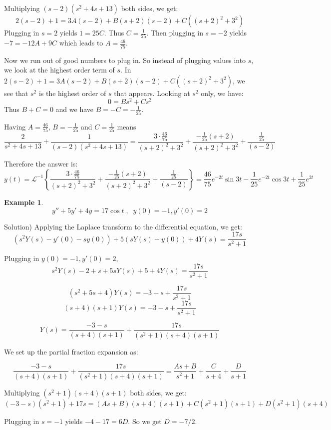 \documentclass[12pt]{report}
\newtheorem{ex}{Example}[section]
\begin{document}
Multiplying $(s-2)(s^2+4s+13)$ both sides, we get:
$$2(s-2)+1 = 3A(s-2)+ B(s+2)(s-2)+C((s+2)^2 + 3^2) $$
Plugging in $s=2$ yields $1=25C$. Thus $C=\frac{1}{25}$. Then plugging in $s=-2$ yields $-7=-12A + 9C $ which leads to $A=\frac{46}{75}$. 

Now we run out of good numbers to plug in. So instead of plugging values into $s$, we look at the highest order term of $s$. In $2(s-2)+1 = 3A(s-2)+ B(s+2)(s-2)+C((s+2)^2 + 3^2) $, we see that $s^2$ is the highest order of $s$ that appears. Looking at $s^2$ only, we have:
$$0= B s^2 + C s^2 $$
Thus $B+C=0$ and we have $B=-C = -\frac{1}{25}$.

Having $A=\frac{46}{75}$, $B= -\frac{1}{25}$ and $C=\frac{1}{25}$ means
$$ \frac{2}{s^2+4s+13} +\frac{1}{(s-2)(s^2+4s+13)}= \frac{3\cdot \tfrac{46}{75}}{(s+2)^2 + 3^2} + \frac{-\tfrac{1}{25}(s+2)}{(s+2)^2 + 3^2} + \frac{\tfrac{1}{25}}{(s-2)} $$

Therefore the answer is:
$$y(t) = \mathcal{L}^{-1} \left\{\frac{3\cdot \tfrac{46}{75}}{(s+2)^2 + 3^2} + \frac{-\tfrac{1}{25}(s+2)}{(s+2)^2 + 3^2} + \frac{\tfrac{1}{25}}{(s-2)} \right\} =  \frac{46}{75}  e^{-2t} \sin{3t} - \frac{1}{25} e^{-2t} \cos{3t}  + \frac{1}{25} e^{2t} $$

\begin{ex}
$$y'' + 5y' +4y = 17 \cos t  \; , \; \;  y(0)=-1, y'(0)=2 $$
\end{ex}
	
Solution)
Applying the Laplace transform to the differential equation, we get:
$$ \left( s^2 Y(s) - y'(0) - s y(0) \right) +5 \left( s Y(s) - y(0) \right) + 4 Y(s) =\frac{17s}{s^2 +1} $$


Plugging in $y(0)=-1, y'(0)=2 $,
$$ s^2 Y(s) -2 + s +5s Y(s)+5 + 4 Y(s) = \frac{17s}{s^2 +1} $$

$$ (s^2+5s+4) Y(s) = -3-s + \frac{17s}{s^2 +1} $$
$$ (s+4)(s+1) Y(s) = -3-s + \frac{17s}{s^2 +1} $$

$$ Y(s) = \frac{-3-s}{(s+4)(s+1)} +\frac{17s}{(s^2 +1)(s+4)(s+1)} $$

We set up the partial fraction expansion as:

$$ \frac{-3-s}{(s+4)(s+1)} +\frac{17s}{(s^2 +1)(s+4)(s+1)}= \frac{As+B}{s^2 +1} + \frac{C}{s+4} + \frac{D}{s+1} $$

Multiplying $(s^2 +1)(s+4)(s+1)$ both sides, we get:
$$(-3-s)(s^2 +1)+17s = (As+B)(s+4)(s+1)+C(s^2 +1)(s+1) + D (s^2 +1)(s+4)$$

Plugging in $s=-1$ yields $-4-17=6D$. So we get $D= -7/2$. 
\end{document}
